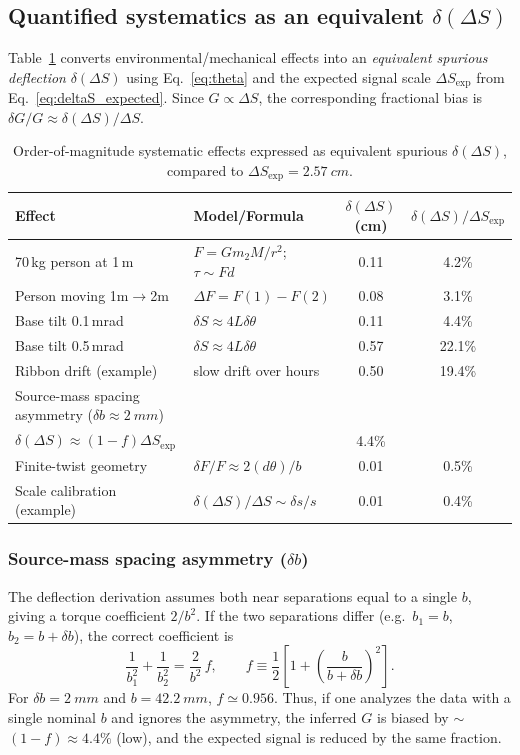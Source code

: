 \documentclass[11pt]{article}
\begin{document}
\subsection*{Quantified systematics as an equivalent $\delta(\Delta S)$}
Table~\ref{tab:sys} converts environmental/mechanical effects into an \emph{equivalent spurious deflection} $\delta(\Delta S)$ using Eq.~\eqref{eq:theta} and the expected signal scale $\Delta S_{\mathrm{exp}}$ from Eq.~\eqref{eq:deltaS_expected}.
Since $G\propto \Delta S$, the corresponding fractional bias is $\delta G/G \approx \delta(\Delta S)/\Delta S$.

\begin{table}[H]
\centering
\small
\setlength{\tabcolsep}{5pt}
\renewcommand{\arraystretch}{1.15}
\caption{Order-of-magnitude systematic effects expressed as equivalent spurious $\delta(\Delta S)$, compared to $\Delta S_{\mathrm{exp}}=\SI{2.57}{cm}$.}
\label{tab:sys}
\begin{tabularx}{\linewidth}{@{}l>{\raggedright\arraybackslash}Xcc@{}}
\toprule
Effect & Model/Formula & $\delta(\Delta S)$ (cm) & $\delta(\Delta S)/\Delta S_{\mathrm{exp}}$ \\ \midrule
70\,kg person at 1\,m & \(F=Gm_2M/r^2\); \(\tau\sim Fd\) & 0.11 & 4.2\% \\
Person moving 1m$\to$2m & \(\Delta F=F(1)-F(2)\) & 0.08 & 3.1\% \\
Base tilt 0.1\,mrad & \(\delta S\approx 4L\delta\theta\) & 0.11 & 4.4\% \\
Base tilt 0.5\,mrad & \(\delta S\approx 4L\delta\theta\) & 0.57 & 22.1\% \\
Ribbon drift (example) & slow drift over hours & 0.50 & 19.4\% \\
Source-mass spacing asymmetry (\(\delta b\approx\SI{2}{mm}\)) &
\makecell[l]{\(f=\tfrac12\!\left[1+\left(\frac{b}{b+\delta b}\right)^2\right]\)\\
\(\delta(\Delta S)\approx(1-f)\Delta S_{\mathrm{exp}}\)} & 0.11 & 4.4\% \\
Finite-twist geometry & \(\delta F/F\approx 2(d\theta)/b\) & 0.01 & 0.5\% \\
Scale calibration (example) & \(\delta(\Delta S)/\Delta S \sim \delta s/s\) & 0.01 & 0.4\% \\
\bottomrule
\end{tabularx}
\end{table}

\subsubsection*{Source-mass spacing asymmetry ($\delta b$)}\label{sec:sys_b}
The deflection derivation assumes both near separations equal to a single $b$, giving a torque coefficient $2/b^2$.
If the two separations differ (e.g.\ $b_1=b$, $b_2=b+\delta b$), the correct coefficient is
\[
\frac{1}{b_1^2}+\frac{1}{b_2^2}=\frac{2}{b^2}\,f,
\qquad
f\equiv \frac{1}{2}\left[1+\left(\frac{b}{b+\delta b}\right)^2\right].
\]
For $\delta b=\SI{2}{mm}$ and $b=\SI{42.2}{mm}$, $f\simeq0.956$.
Thus, if one analyzes the data with a single nominal $b$ and ignores the asymmetry, the inferred $G$ is biased by $\sim$$(1-f)\approx 4.4\%$ (low), and the expected signal is reduced by the same fraction.
\end{document}
